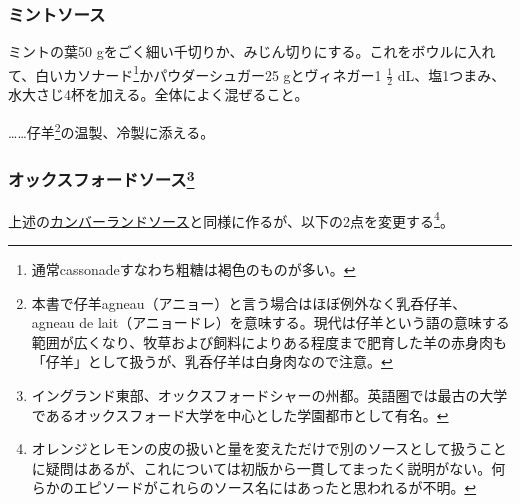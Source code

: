 \begin{recette}
\atoaki{}

\hypertarget{mint-sauce}{%
\subsubsection{ミントソース}\label{mint-sauce}}



ミントの葉50
gをごく細い千切りか、みじん切りにする。これをボウルに入れて、白いカソナード\footnote{通常cassonadeすなわち粗糖は褐色のものが多い。}かパウダーシュガー25
gとヴィネガー1 \(\frac{1}{2}\)
dL、塩1つまみ、水大さじ4杯を加える。全体によく混ぜること。

\ldots{}\ldots{}仔羊\footnote{本書で仔羊agneau（アニョー）と言う場合はほぼ例外なく乳呑仔羊、
  agneau de
  lait（アニョードレ）を意味する。現代は仔羊という語の意味する範囲が広くなり、牧草および飼料によりある程度まで肥育した羊の赤身肉も「仔羊」として扱うが、乳呑仔羊は白身肉なので注意。}の温製、冷製に添える。

\atoaki{}

\hypertarget{oxford-sauce}{%
\subsubsection[オックスフォードソース]{\texorpdfstring{オックスフォードソース\footnote{イングランド東部、オックスフォードシャーの州都。英語圏では最古の大学であるオックスフォード大学を中心とした学園都市として有名。}}{オックスフォードソース}}\label{oxford-sauce}}



上述の\protect\hyperlink{cumberland-sauce}{カンバーランドソース}と同様に作るが、以下の2点を変更する\footnote{オレンジとレモンの皮の扱いと量を変えただけで別のソースとして扱うことに疑問はあるが、これについては初版から一貫してまったく説明がない。何らかのエピソードがこれらのソース名にはあったと思われるが不明。}。


\end{recette}
